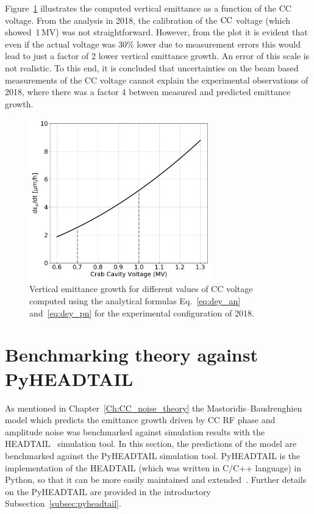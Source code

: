 Figure~\ref{fig:sensitivity_VCC_theory_bunch1} illustrates the computed vertical emittance as a function of the CC voltage. From the analysis in 2018, 
the calibration of the ${\mathrm{CC}}$ voltage (which showed~1\,MV) was not straightforward. However, from the plot it is evident that even if the actual voltage was 30$\%$ lower due to measurement errors this would lead to just a factor of 2 lower vertical emittance growth. An error of this scale is not realistic. To this end, it is concluded that uncertainties on the beam based measurements of the CC voltage cannot explain the experimental observations of 2018, where there was a factor 4 between measured and predicted emittance growth.

\begin{figure}[!h]
    \centering         
    \includegraphics[width=0.7\textwidth]{images/Ch6/dey_vs_Vcc_Coast2-Setting2.png}
        \caption{Vertical emittance growth for different values of CC voltage computed using the analytical formulas Eq.~\eqref{eq:dey_an} and~\eqref{eq:dey_pn} for the experimental configuration of 2018.}
        \label{fig:sensitivity_VCC_theory_bunch1}
 \end{figure}

\section{Benchmarking theory against PyHEADTAIL}\label{sec:benchmark_theory_with_pyheadtail}

As mentioned in Chapter~\ref{Ch:CC_noise_theory} the Mastoridis--Baudrenghien model which predicts the emittance growth driven by CC RF phase and amplitude noise was benchmarked against simulation results with the HEADTAIL~\cite{PhysRevSTAB.18.101001} simulation tool. In this section, the predictions of the model are benchmarked against the PyHEADTAIL simulation tool. PyHEADTAIL is the implementation of the HEADTAIL (which was written in C/C++ language) in Python, so that it can be more easily maintained and extended~\cite{pyheadtail_schenk}. Further details on the PyHEADTAIL are provided in the introductory Subsection~\ref{subsec:pyheadtail}.


